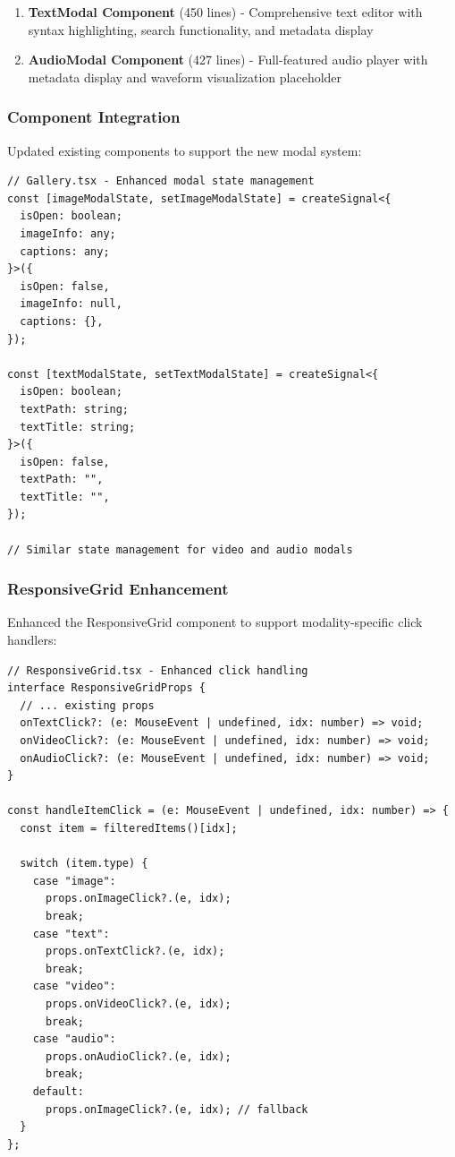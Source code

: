 \documentclass[11pt]{article}
\begin{document}
\begin{enumerate}
\item \textbf{TextModal Component} (450 lines) - Comprehensive text editor with syntax highlighting, search functionality, and metadata display
\item \textbf{AudioModal Component} (427 lines) - Full-featured audio player with metadata display and waveform visualization placeholder
\end{enumerate}

\subsubsection{Component Integration}

Updated existing components to support the new modal system:

\begin{lstlisting}[style=typescript]
// Gallery.tsx - Enhanced modal state management
const [imageModalState, setImageModalState] = createSignal<{
  isOpen: boolean;
  imageInfo: any;
  captions: any;
}>({
  isOpen: false,
  imageInfo: null,
  captions: {},
});

const [textModalState, setTextModalState] = createSignal<{
  isOpen: boolean;
  textPath: string;
  textTitle: string;
}>({
  isOpen: false,
  textPath: "",
  textTitle: "",
});

// Similar state management for video and audio modals
\end{lstlisting}

\subsubsection{ResponsiveGrid Enhancement}

Enhanced the ResponsiveGrid component to support modality-specific click handlers:

\begin{lstlisting}[style=typescript]
// ResponsiveGrid.tsx - Enhanced click handling
interface ResponsiveGridProps {
  // ... existing props
  onTextClick?: (e: MouseEvent | undefined, idx: number) => void;
  onVideoClick?: (e: MouseEvent | undefined, idx: number) => void;
  onAudioClick?: (e: MouseEvent | undefined, idx: number) => void;
}

const handleItemClick = (e: MouseEvent | undefined, idx: number) => {
  const item = filteredItems()[idx];
  
  switch (item.type) {
    case "image":
      props.onImageClick?.(e, idx);
      break;
    case "text":
      props.onTextClick?.(e, idx);
      break;
    case "video":
      props.onVideoClick?.(e, idx);
      break;
    case "audio":
      props.onAudioClick?.(e, idx);
      break;
    default:
      props.onImageClick?.(e, idx); // fallback
  }
};
\end{lstlisting}
\end{document}
